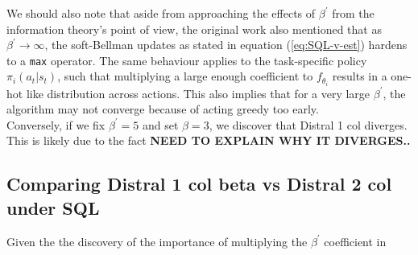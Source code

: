 \documentclass[12pt]{report}
\begin{document}
We should also note that aside from approaching the effects of $\beta^\prime$ from the information theory's point of view, the original work \cite{teh2017distral} also mentioned that as $\beta^\prime \rightarrow \infty$, the soft-Bellman updates as stated in equation (\ref{eq:SQL-v-est}) hardens to a \texttt{max} operator. The same behaviour applies to the task-specific policy $\pi_i(a_t|s_t)$, such that multiplying a large enough coefficient to $f_{\theta_i}$ results in a one-hot like distribution across actions. This also implies that for a very large $\beta^\prime$, the algorithm may not converge because of acting greedy too early.\\

Conversely, if we fix $\beta^\prime = 5$ and set $\beta = 3$, we discover that Distral 1 col diverges. This is likely due to the fact \textbf{NEED TO EXPLAIN WHY IT DIVERGES..}

\subsection{Comparing Distral 1 col beta vs Distral 2 col under SQL}

Given the the discovery of the importance of multiplying the $\beta^\prime$ coefficient in 


\end{document}
